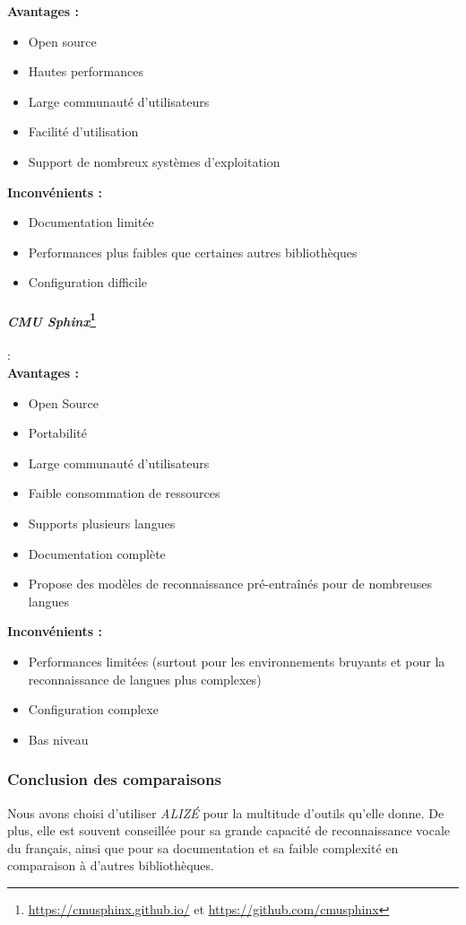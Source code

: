 \textbf{Avantages :}
\begin{itemize}
    \item Open source
    \item Hautes performances
    \item Large communauté d'utilisateurs
    \item Facilité d'utilisation
    \item Support de nombreux systèmes d'exploitation
\end{itemize}

\textbf{Inconvénients :}
\begin{itemize}
    \item Documentation limitée
    \item Performances plus faibles que certaines autres bibliothèques
    \item Configuration difficile
\end{itemize}

\paragraph*{\textbf{\textit{CMU Sphinx}}\footnote{\url{https://cmusphinx.github.io/} et \url{https://github.com/cmusphinx}}}: \\

\textbf{Avantages :}
\begin{itemize}
    \item Open Source
    \item Portabilité
    \item Large communauté d'utilisateurs
    \item Faible consommation de ressources
    \item Supports plusieurs langues
    \item Documentation complète
    \item Propose des modèles de reconnaissance pré-entraînés pour de nombreuses langues
\end{itemize}

\textbf{Inconvénients :}
\begin{itemize}
    \item Performances limitées (surtout pour les environnements bruyants et pour la reconnaissance de langues plus complexes)
    \item Configuration complexe
    \item Bas niveau
\end{itemize}

\subsubsection*{Conclusion des comparaisons}

Nous avons choisi d'utiliser \textit{ALIZÉ} pour la multitude d'outils qu'elle donne. De plus, elle est souvent conseillée pour sa grande capacité de reconnaissance 
vocale du français, ainsi que pour sa documentation et sa faible complexité en comparaison à d'autres bibliothèques.



